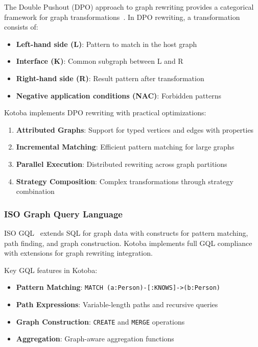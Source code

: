 \documentclass[11pt,a4paper]{article}
\begin{document}
The Double Pushout (DPO) approach to graph rewriting provides a categorical framework for graph transformations~\cite{ehrig1973}. In DPO rewriting, a transformation consists of:

\begin{itemize}
\item \textbf{Left-hand side (L)}: Pattern to match in the host graph
\item \textbf{Interface (K)}: Common subgraph between L and R
\item \textbf{Right-hand side (R)}: Result pattern after transformation
\item \textbf{Negative application conditions (NAC)}: Forbidden patterns
\end{itemize}

Kotoba implements DPO rewriting with practical optimizations:
\begin{enumerate}
\item \textbf{Attributed Graphs}: Support for typed vertices and edges with properties
\item \textbf{Incremental Matching}: Efficient pattern matching for large graphs
\item \textbf{Parallel Execution}: Distributed rewriting across graph partitions
\item \textbf{Strategy Composition}: Complex transformations through strategy combination
\end{enumerate}

\subsubsection{ISO Graph Query Language}
\label{subsubsec:gql}

ISO GQL~\cite{iso_gql} extends SQL for graph data with constructs for pattern matching, path finding, and graph construction. Kotoba implements full GQL compliance with extensions for graph rewriting integration.

Key GQL features in Kotoba:
\begin{itemize}
\item \textbf{Pattern Matching}: \verb|MATCH (a:Person)-[:KNOWS]->(b:Person)|
\item \textbf{Path Expressions}: Variable-length paths and recursive queries
\item \textbf{Graph Construction}: \verb|CREATE| and \verb|MERGE| operations
\item \textbf{Aggregation}: Graph-aware aggregation functions
\end{itemize}
\end{document}
